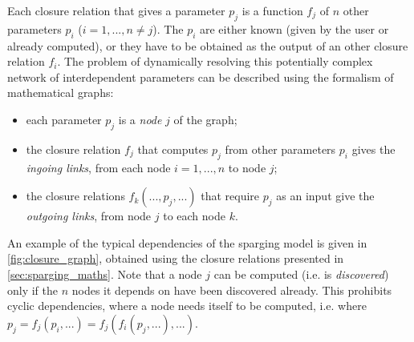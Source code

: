 \documentclass[a4paper,11pt,oneside]{report}
\begin{document}
Each closure relation that gives a parameter $p_j$ is a function $f_j$ of $n$ other parameters $p_i$ ($i=1,...,n\neq j$). The $p_i$ are either known (given by the user or already computed), or they have to be obtained as the output of an other closure relation $f_i$. The problem of dynamically resolving this potentially complex network of interdependent parameters can be described using the formalism of mathematical graphs:
\begin{itemize}
    \item each parameter $p_j$ is a \textit{node} $j$ of the graph;
    \item the closure relation $f_j$ that computes $p_j$ from other parameters $p_i$ gives the \textit{ingoing links}, from each node $i=1,...,n$ to node $j$;
    \item the closure relations $f_k(...,p_j,...)$ that require $p_j$ as an input give the \textit{outgoing links}, from node $j$ to each node $k$.
\end{itemize}   
An example of the typical dependencies of the sparging model is given in \cref{fig:closure_graph}, obtained using the closure relations presented in \cref{sec:sparging_maths}. Note that a node $j$ can be computed (i.e. is \textit{discovered}) only if the $n$ nodes it depends on have been discovered already. This prohibits cyclic dependencies, where a node needs itself to be computed, i.e. where $p_j=f_j(p_i,...)=f_j(f_i(p_j,...),...)$.
\end{document}

